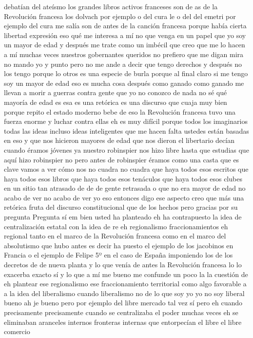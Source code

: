 debatían del ateísmo los grandes libros activos franceses son de as de la Revolución francesa los dolvach por ejemplo
o del cura le o del del emetri por ejemplo del cura me salía son de antes de la canción francesa porque había cierta libertad expresión
eso qué me interesa a mí no que venga en un papel que yo soy un mayor de edad y después me trate como un imbécil
que creo que me lo hacen a mí muchas veces nuestros gobernantes queridos no prefiero que me digan mira no mando yo y punto
pero no me ande a decir que tengo derechos y después no los tengo porque lo otros es una especie de burla porque al final claro
si me tengo soy un mayor de edad eso es mucha cosa después como ganado como ganado me llevan a morir a guerras
contra gente que yo no conozco de nada no sé qué mayoría de edad es esa es una retórica es una discurso que cuaja muy bien porque repito
el estado moderno bebe de eso la Revolución francesa tuvo una fuerza enorme y luchar contra ellas eh
es muy difícil porque todos los imaginarios todas las ideas incluso ideas inteligentes que me hacen falta ustedes
están basadas en eso y que nos hicieron mayores de edad que nos dieron el libertario decían cuando éramos jóvenes ya
nuestro robinspier nos hizo libre hasta que estudias que aquí hizo robinspier no pero antes de robinspier éramos como una casta
que es clave vamos a ver cómo nos no cuadra no cuadra que haya todos esos escritos que haya todos esos libros
que haya todos esos tenáculos que haya todos esos clubes en un sitio tan atrasado de de de gente retrasada o que no era mayor de edad
no acabo de ver no acabo de ver yo eso entonces digo ese aspecto creo que más una retórica
fruta del discurso constitucional que de los hechos pero gracias por su pregunta
Pregunta
sí em bien usted ha planteado eh
ha contrapuesto la idea de centralización estatal con la idea de re eh regionalismo
fraccionamientos eh regional tanto en el marco de la Revolución francesa
como en el marco del absolutismo que hubo antes es decir ha puesto el ejemplo de los jacobinos en Francia
o el ejemplo de Felipe 5º en el caso de España imponiendo los de los decretos de de nueva planta
y lo que venía de antes la Revolución francesa lo lo exacerba exacto sí y lo que a mí me bueno
me confunde un poco la la cuestión de eh plantear ese regionalismo ese fraccionamiento territorial
como algo favorable a a la idea del liberalismo cuando liberalismo no de lo que soy yo
yo no soy liberal bueno ah je bueno pero por ejemplo del libre mercado tal vez sí
pero eh cuando precisamente precisamente cuando se centralizaba el poder muchas veces eh
se eliminaban aranceles internos fronteras internas que entorpecían el libre el libre comercio
